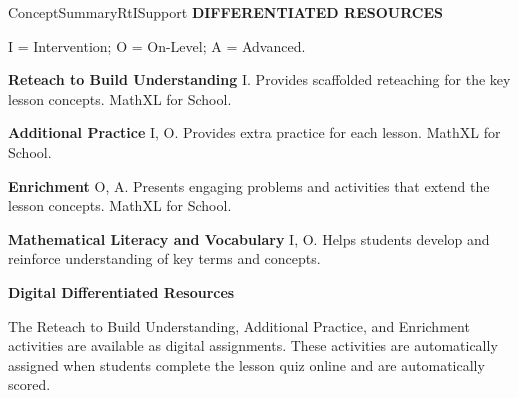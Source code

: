 \documentclass{article}
\newenvironment{te-addendum}[2]{}{}     %
\newcommand{\te}[1]{}                   %
\begin{document}
\begin{te-addendum}{ConceptSummary}{RtISupport}
\textbf{DIFFERENTIATED RESOURCES}

I = Intervention; O = On-Level; A = Advanced.

\textbf{Reteach to Build Understanding} I. Provides scaffolded reteaching for the key lesson concepts. MathXL for School.

\textbf{Additional Practice} I, O. Provides extra practice for each lesson. MathXL for School.

\textbf{Enrichment} O, A. Presents engaging problems and activities that extend the lesson concepts. MathXL for School.

\textbf{Mathematical Literacy and Vocabulary} I, O. Helps students develop and reinforce understanding of key terms and concepts.

\textbf{Digital Differentiated Resources}

The Reteach to Build Understanding, Additional Practice, and Enrichment activities are available as digital assignments. These activities are automatically assigned when students complete the lesson quiz online and are automatically scored.

\te{The page includes thumbnail previews of the four named differentiated worksheets and an online graphing interface; these are resource previews, separate from the lesson's numbered Practice & Problem Solving items.}
\end{te-addendum}
\end{document}
